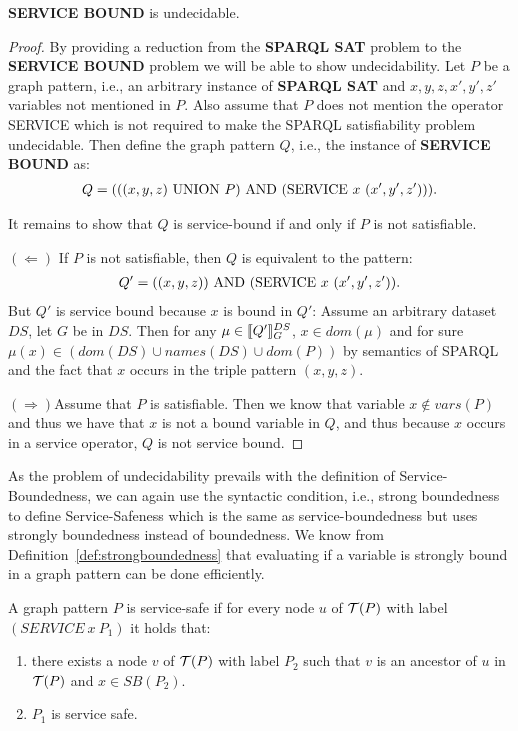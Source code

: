\begin{theorem}
	\textbf{SERVICE BOUND} is undecidable.
\end{theorem}
\begin{proof}
By providing a reduction from the \textbf{SPARQL SAT} problem to the  
\textbf{SERVICE BOUND} problem we will be able to show undecidability.
Let $P$ be a graph pattern, i.e., an arbitrary instance of \textbf{SPARQL SAT} and
$x,y,z,x',y',z'$ variables not mentioned in $P$.
Also assume that $P$ does not mention the operator SERVICE which is not required
to make the SPARQL satisfiability problem undecidable.
Then define the graph pattern $Q$, i.e., the instance of \textbf{SERVICE BOUND} as: 
\begin{align*}
	Q = (((x,y,z) \mbox{ UNION }  P) \mbox{ AND } (\mbox{SERVICE } x \ (x', y', z'))).
\end{align*}

\noindent It remains to show that $Q$ is service-bound if and only if $P$ is not
satisfiable.

\bigskip\noindent
$(\Leftarrow)$ \quad If $P$ is not satisfiable, then $Q$ is equivalent to the
pattern: 
\begin{align*}
	Q' = ((x,y,z)) \mbox{ AND } (\mbox{SERVICE} \ x \ (x', y', z')).
\end{align*} 
But $Q'$ is service bound because $x$ is bound in $Q'$: Assume an
arbitrary dataset $DS$, let $G$ be in $DS$. Then 
for any $\mu \in \llbracket Q' \rrbracket^{DS}_G$, $x \in dom(\mu)$ and for sure $\mu(x) \in
(dom(DS) \cup names(DS) \cup dom(P))$ by semantics of SPARQL and the fact that
$x$ occurs in the triple pattern $(x,y,z)$.


\bigskip\noindent
$(\Rightarrow)$\quad Assume that $P$ is satisfiable. Then we know that variable
$x \not\in vars(P)$ and thus we have that $x$ is not a bound variable in $Q$,
and thus because $x$ occurs in a service operator, $Q$ is not service bound.
\end{proof}

As the problem of undecidability prevails with the definition of
Service-Boundedness, we can again use the syntactic condition, i.e., strong boundedness to define
Service-Safeness which is the same as service-boundedness but uses strongly
boundedness instead of boundedness. We know from
Definition~\ref{def:strongboundedness} that evaluating if a variable is strongly
bound in a graph pattern can be done efficiently.

\begin{definition}
	A graph pattern $P$ is service-safe if for every node $u$ of $\mathcal{T}(P)$ with
	label $(SERVICE \ x \ P_1)$ it holds that:
	\begin{enumerate}
		\item there exists a node $v$ of $\mathcal{T}(P)$ with label $P_2$ such that $v$
			is an ancestor of $u$ in $\mathcal{T}(P)$ and $x \in SB(P_2)$.
		\item $P_1$ is service safe.
	\end{enumerate}
\end{definition}

